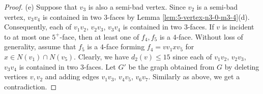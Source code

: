 \documentclass[12pt, reqno]{amsart}
\theoremstyle{plain}
\theoremstyle{definition}
\numberwithin{equation}{section}
\begin{document}
\begin{proof}
(e) Suppose that $v_3$ is also a semi-bad vertex. Since $v_2$ is a semi-bad vertex,  $v_3v_4$ is contained in two $3$-faces by Lemma \ref{lem:5-vertex-n3-0-m3-4}(d). Consequently, each of $v_1v_2$,  $v_2v_3$, $v_3v_4$ is contained in two $3$-faces. If $v$ is incident to at most one $5^+$-face, then at least one of $f_4,f_5$ is a $4$-face. Without loss of generality, assume that $f_5$ is a $4$-face forming $f_4=vv_1xv_5$ for $x\in N(v_1)\cap N(v_5)$. Clearly, we have $d_2(v)\leq 15$ since each of  $v_1v_2$, $v_2v_3$, $v_3v_4$ is contained in two $3$-faces. 
Let $G'$ be the graph obtained from $G$ by deleting vertices $v,v_2$ and adding edges $v_1v_3$, $v_4v_5$, $v_6v_7$. Similarly as above, we get a contradiction. 
%
%
\end{proof}
\end{document}
